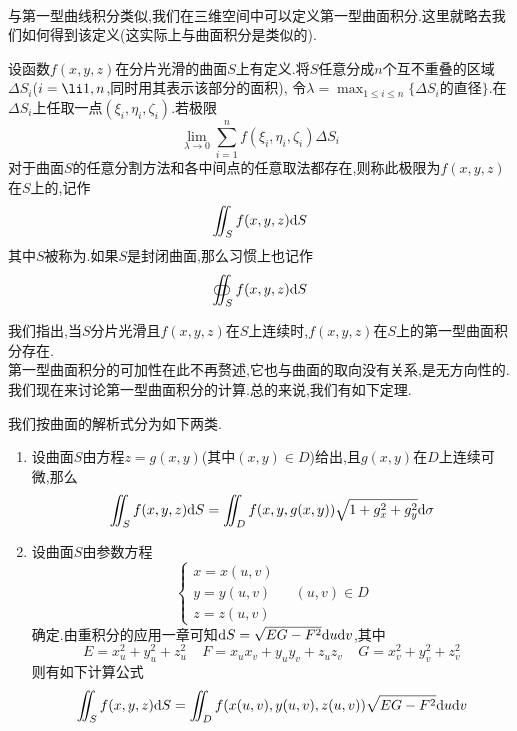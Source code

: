 \documentclass{ctexart}
\begin{document}
\pagestyle{empty}
\begin{center}\large{}\end{center}
\\
与第一型曲线积分类似,我们在三维空间中可以定义第一型曲面积分.这里就略去我们如何得到该定义(这实际上与曲面积分是类似的).
\begin{definition}[1.1 定义:第一型曲线积分]
    设函数$f(x,y,z)$在分片光滑的曲面$S$上有定义.将$S$任意分成$n$个互不重叠的区域$\Delta S_i$($i=\li 1,n$,同时用其表示该部分的面积),%
    令$\displaystyle\lambda=\max_{1\leqslant i\leqslant n}\{\Delta S_i\text{的直径}\}$.在$\Delta S_i$上任取一点$\left(\xi_i,\eta_i,\zeta_i\right)$.若极限
    \[\lim_{\lambda\to0}\sum_{i=1}^{n}f(\xi_i,\eta_i,\zeta_i)\Delta S_i\]
    对于曲面$S$的任意分割方法和各中间点的任意取法都存在,则称此极限为$f(x,y,z)$在$S$上的,记作
    \[\iint_{S}f(x,y,z)\mathrm{d} S\]
    其中$S$被称为.如果$S$是封闭曲面,那么习惯上也记作
    \[\oiint_{S}f(x,y,z)\mathrm{d} S\]
\end{definition}\noindent
我们指出,当$S$分片光滑且$f(x,y,z)$在$S$上连续时,$f(x,y,z)$在$S$上的第一型曲面积分存在.\\
第一型曲面积分的可加性在此不再赘述,它也与曲面的取向没有关系,是无方向性的.\\
我们现在来讨论第一型曲面积分的计算.总的来说,我们有如下定理.
\begin{formal}[1.2 第一型曲面积分的计算]
    我们按曲面的解析式分为如下两类.
    \begin{enumerate}[label=\tbf{\alph*.}]
        \item 设曲面$S$由方程$z=g(x,y)$(其中$(x,y)\in D$)给出,且$g(x,y)$在$D$上连续可微,那么
            \[\iint_Sf(x,y,z)\mathrm{d} S=\iint_Df(x,y,g(x,y))\sqrt{1+g_x^2+g_y^2}\mathrm{d}\sigma\]
        \item 设曲面$S$由参数方程
            \[\left\{\begin{array}{l}
                x=x(u,v)\\y=y(u,v)\\z=z(u,v)
            \end{array}\right.\ \ \ \ \ (u,v)\in D\]
            确定.由重积分的应用一章可知$\mathrm{d} S=\sqrt{EG-F^2}\mathrm{d} u\mathrm{d} v$,其中
            \[
                E=x_u^2+y_u^2+z_u^2\ \ \ \ \ 
                F=x_ux_v+y_uy_v+z_uz_v\ \ \ \ \ 
                G=x_v^2+y_v^2+z_v^2
            \]
            则有如下计算公式
            \[\iint_Sf(x,y,z)\mathrm{d} S=\iint_Df(x(u,v),y(u,v),z(u,v))\sqrt{EG-F^2}\mathrm{d} u\mathrm{d} v\]
    \end{enumerate}
\end{formal}\noindent
\end{document}
